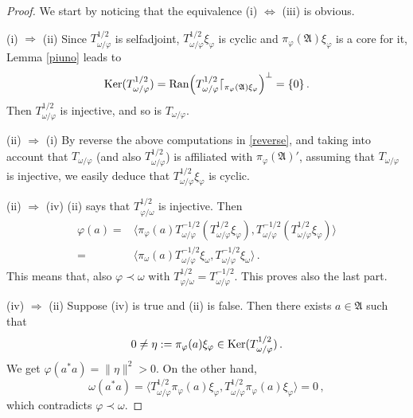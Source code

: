 \documentclass[12pt]{amsart}
\numberwithin{equation}{section}
\def\ga{{\mathfrak A}} \def\gpa{{\mathfrak a}}
\def\f{\varphi}\def\ff{\phi} \def\F{\Phi}
\def\om{\omega} \def\Om{\Omega}
\begin{document}
\begin{proof}
We start by noticing that the equivalence (i) $\Leftrightarrow$ (iii) is obvious.

(i) $\Rightarrow$ (ii) Since $T^{1/2}_{\om/\f}$ is selfadjoint,  $T^{1/2}_{\om/\f}\xi_\f$ is cyclic and $\pi_\f(\ga)\xi_\f$ is a core for it, Lemma \ref{piuno} leads to
\begin{equation}
\label{reverse}
{\rm Ker}(T^{1/2}_{\om/\f})={\rm Ran}\Big(T^{1/2}_{\om/\f}\lceil_{\pi_\f(\ga)\xi_\f}\Big)^\perp=\{0\}\,.
\end{equation}
Then $T^{1/2}_{\om/\f}$ is injective, and so is $T_{\om/\f}$. 

(ii) $\Rightarrow$ (i) By reverse the above computations in \eqref{reverse}, and taking into account that $T_{\om/\f}$ (and also $T^{1/2}_{\om/\f}$) is affiliated with $\pi_\f(\ga)'$, assuming that $T_{\om/\f}$ is injective, we easily deduce that $T_{\om/\f}^{1/2}\xi_\f$ is cyclic.

(ii) $\Rightarrow$ (iv) (ii) says that $T_{\f/\om}^{1/2}$ is injective.  Then
\begin{align*}
\f(a)=&\langle\pi_\f(a)T_{\om/\f}^{-1/2}(T_{\om/\f}^{1/2}\xi_\f),T_{\om/\f}^{-1/2}(T_{\om/\f}^{1/2}\xi_\f)\rangle\\
=&\langle\pi_\om(a)T_{\om/\f}^{-1/2}\xi_\om,T_{\om/\f}^{-1/2}\xi_\om\rangle\,.
\end{align*}
This means that, also $\f\prec\om$ with $T_{\f/\om}^{1/2}=T_{\om/\f}^{-1/2}$. This proves also the last part.

(iv) $\Rightarrow$ (ii) Suppose (iv) is true and (ii) is false. Then there exists $a\in\ga$ such that
$$
0\neq\eta:=\pi_\f(a)\xi_\f\in{\rm Ker}(T_{\om/\f}^{1/2})\,.
$$
We get $\f(a^*a)=\|\eta\|^2>0$. On the other hand,
$$
\om(a^*a)=\langle T_{\om/\f}^{1/2}\pi_\f(a)\xi_\f,T_{\om/\f}^{1/2}\pi_\f(a)\xi_\f\rangle=0\,,
$$
which contradicts $\f\prec\om$.
\end{proof}
\end{document}

